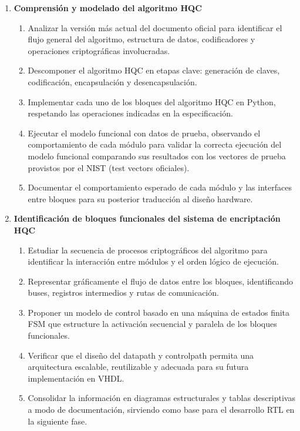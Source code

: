 \begin{enumerate}
  \item \textbf{Comprensión y modelado del algoritmo HQC}
    \begin{enumerate}[label*=\arabic*.]
      \item Analizar la versión más actual del documento oficial para identificar el flujo general del algoritmo, estructura de datos, codificadores y operaciones criptográficas involucradas. 
      \item Descomponer el algoritmo HQC en etapas clave: generación de claves, codificación, encapsulación y desencapsulación.
      \item Implementar cada uno de los bloques del algoritmo HQC en Python, respetando las operaciones indicadas en la especificación.
      \item Ejecutar el modelo funcional con datos de prueba, observando el comportamiento de cada módulo para validar la correcta ejecución del modelo funcional comparando sus resultados con los vectores de prueba provistos por el NIST (test vectors oficiales).
      \item Documentar el comportamiento esperado de cada módulo y las interfaces entre bloques para su posterior traducción al diseño hardware.
    \end{enumerate}
    
  \item \textbf{Identificación de bloques funcionales del sistema de encriptación HQC}
    \begin{enumerate}[label*=\arabic*.]
      \item Estudiar la secuencia de procesos criptográficos del algoritmo para identificar la interacción entre módulos y el orden lógico de ejecución.
      \item Representar gráficamente el flujo de datos entre los bloques, identificando buses, registros intermedios y rutas de comunicación.
      \item Proponer un modelo de control basado en una máquina de estados finita FSM que estructure la activación secuencial y paralela de los bloques funcionales.
      \item Verificar que el diseño del datapath y controlpath permita una arquitectura escalable, reutilizable y adecuada para su futura implementación en VHDL.
      \item Consolidar la información en diagramas estructurales y tablas descriptivas a modo de documentación, sirviendo como base para el desarrollo RTL en la siguiente fase.
      

\end{enumerate}
\end{enumerate}
